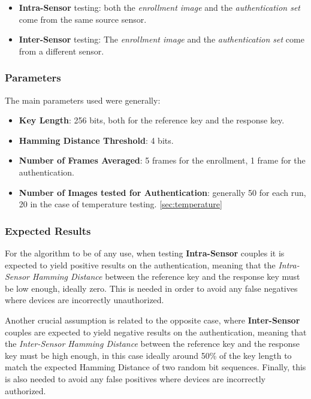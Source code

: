 \begin{itemize}
	\item \textbf{Intra-Sensor} testing: both the \emph{enrollment image} and the \emph{authentication set} come from the same source sensor.
	\item \textbf{Inter-Sensor} testing: The \emph{enrollment image} and the \emph{authentication set} come from a different sensor.
\end{itemize}

\subsubsection{Parameters}
The main parameters used were generally:
\begin{itemize}
	\item \textbf{Key Length}: 256 bits, both for the reference key and the response key.
	\item \textbf{Hamming Distance Threshold}: 4 bits.
	\item \textbf{Number of Frames Averaged}: 5 frames for the enrollment, 1 frame for the authentication.
	\item \textbf{Number of Images tested for Authentication}: generally 50 for each run, 20 in the case of temperature testing. \ref{sec:temperature}
\end{itemize}

\subsubsection{Expected Results}

For the algorithm to be of any use, when testing \textbf{Intra-Sensor} couples it is expected to yield positive results on the authentication, meaning that the \emph{Intra-Sensor Hamming Distance} between the reference key and the response key must be low enough, ideally zero. This is needed in order to avoid any false negatives where devices are incorrectly unauthorized.

Another crucial assumption is related to the opposite case, where \textbf{Inter-Sensor} couples are expected to yield negative results on the authentication, meaning that the \emph{Inter-Sensor Hamming Distance} between the reference key and the response key must be high enough, in this case ideally around 50\% of the key length to match the expected Hamming Distance of two random bit sequences. Finally, this is also needed to avoid any false positives where devices are incorrectly authorized.


